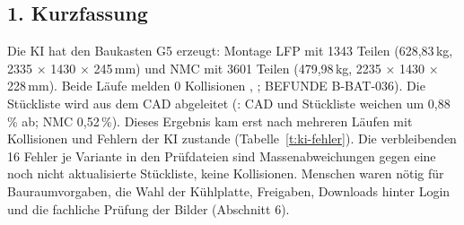 \documentclass[10pt,a4paper]{article}
\begin{document}
\subsection*{1. Kurzfassung}
Die KI hat den Baukasten G5 erzeugt: Montage LFP mit 1343 Teilen (628,83\,kg, 2335 × 1430 × 245\,mm) und NMC mit 3601 Teilen (479,98\,kg, 2235 × 1430 × 228\,mm). Beide Läufe melden 0 Kollisionen , ; BEFUNDE B-BAT-036). Die Stückliste wird aus dem CAD abgeleitet (: CAD und Stückliste weichen um 0,88\,\% ab; NMC 0,52\,\%). Dieses Ergebnis kam erst nach mehreren Läufen mit Kollisionen und Fehlern der KI zustande (Tabelle~\ref{t:ki-fehler}). Die verbleibenden 16 Fehler je Variante in den Prüfdateien sind Massenabweichungen gegen eine noch nicht aktualisierte Stückliste, keine Kollisionen. Menschen waren nötig für Bauraumvorgaben, die Wahl der Kühlplatte, Freigaben, Downloads hinter Login und die fachliche Prüfung der Bilder (Abschnitt 6).
\end{document}
